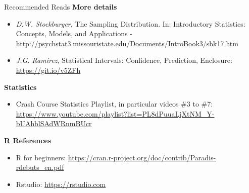 \begin{frame}{Recommended Reads}
  {\bf More details}
  \begin{itemize}
    \item \emph{D.W. Stockburger}, The Sampling Distribution. In: Introductory Statistics: Concepts, Models, and Applications -
    \url{http://psychstat3.missouristate.edu/Documents/IntroBook3/sbk17.htm}
    \item \emph{J.G. Ramírez}, Statistical Intervals: Confidence, Prediction, Enclosure: \url{https://git.io/v5ZFh}
  \end{itemize}

  {\bf Statistics}
  \begin{itemize}
    \item Crash Course Statistics Playlist, in particular videos \#3 to \#7: \url{https://www.youtube.com/playlist?list=PL8dPuuaLjXtNM_Y-bUAhblSAdWRnmBUcr}
  \end{itemize}

  {\bf R References}
  \begin{itemize}
    \item R for beginners: \url{https://cran.r-project.org/doc/contrib/Paradis-rdebuts_en.pdf}
    \item Rstudio: \url{https://rstudio.com}
  \end{itemize}
\end{frame}
